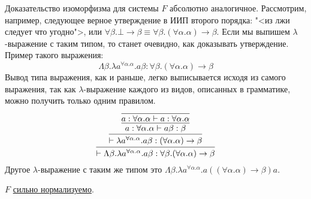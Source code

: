 Доказательство изоморфизма для системы $F$ абсолютно аналогичное.
Рассмотрим, например, следующее верное утверждение в ИИП второго порядка: "<из лжи следует что угодно">, или
$\forall \beta . \bot \to \beta \equiv \forall \beta . (\forall \alpha.\alpha) \to \beta$.
Если мы выпишем $\lambda$-выражение с таким типом, то станет очевидно, как доказывать утверждение. Пример такого выражения:
\[
    \Lambda \beta . \lambda a^{\forall \alpha.\alpha} . a \beta :
    \forall \beta . (\forall \alpha.\alpha) \to \beta
\]
Вывод типа выражения, как и раньше, легко выписывается исходя из самого выражения,
так как $\lambda$-выражение каждого из видов, описанных в грамматике, можно получить только одним правилом.
\[
    \infer{\vdash \Lambda \beta . \lambda a^{\forall \alpha.\alpha} . a \beta : \forall \beta . (\forall \alpha.\alpha) \to \beta}
    {   \infer{\vdash \lambda a^{\forall \alpha.\alpha} . a \beta : (\forall \alpha.\alpha) \to \beta}
        {   \infer{a : \forall \alpha . \alpha \vdash a \beta : \beta}
            {   \infer{a : \forall \alpha.\alpha \vdash a : \forall \alpha.\alpha}{}
            }
        }
    }
\]
Другое $\lambda$-выражение с таким же типом это
$\Lambda \beta . \lambda a^{\forall \alpha . \alpha} . a ((\forall \alpha.\alpha) \to \beta) a$.

\begin{theorem}
    $F$ \hyperref[strong-normalization]{сильно нормализуемо}.
\end{theorem}
